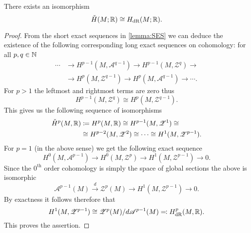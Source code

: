 \documentclass[11pt]{preprint}
\def\cA{\mathscr{A}}
\def\cZ{\mathscr{Z}}
\def\Cech{\check{H}}
\def\Rham{H_{\mathrm{dR}}}
\numberwithin{equation}{section}
\begin{document}
\begin{theorem}
    There exists an isomorphism
    \[ 
       \Cech(M ; \R) \cong \Rham(M;\R). 
    \]
\end{theorem}
\begin{proof}
  From the short exact sequences in \autoref{lemma:SES} we can deduce the existence of the following corresponding long exact sequences on cohomology: for all $p,q \in {\mathbb N}$
  \begin{align*}
    \cdots &\longrightarrow H^{p-1}(M, \cA^{q-1}) \longrightarrow H^{p-1}(M, \cZ^{q})\longrightarrow \\
    & \longrightarrow H^{p}(M, \cZ^{q-1})\longrightarrow H^{p}(M, \cA^{q-1})\longrightarrow \cdots.
  \end{align*}
  For $p > 1$ the leftmost and rightmost terms are zero thus 
  \[
    H^{p-1}(M, \cZ^{q}) \cong  H^{p}(M, \cZ^{q-1}).
  \]
  This gives us the following sequence of isomorphisms
  \begin{align*}
    \Cech^p(M, \R) &\coloneqq H^p(M,\R) \cong H^{p-1}(M,\cZ^{1}) \cong\\
    & \cong  H^{p-2}(M,\cZ^{2}) \cong \cdots \cong  H^{1}(M,\cZ^{p-1}).
  \end{align*}
  For $p = 1$ (in the above sense) we get the following exact sequence
  \[
      H^0(M, \cA^{p-1}) \longrightarrow  H^0(M, \cZ^{p}) \longrightarrow H^1(M, \cZ^{p-1}) \longrightarrow 0.  
  \]
  Since the $0^{\text{th}}$ order cohomology is simply the space of global sections the above is isomorphic
  \[
      \cA^{p-1}(M) \stackrel{d}{\longrightarrow} \cZ^{p}(M) \longrightarrow H^1(M, \cZ^{p-1}) \longrightarrow 0.  
  \] 
  By exactness it follows therefore that 
  \[
      H^1(M, \cZ^{p-1}) \cong   \cZ^{p}(M) /  d \cA^{p-1}(M) \eqqcolon \Rham^p(M, \R).
  \]
  This proves the assertion.
\end{proof}







\end{document}
